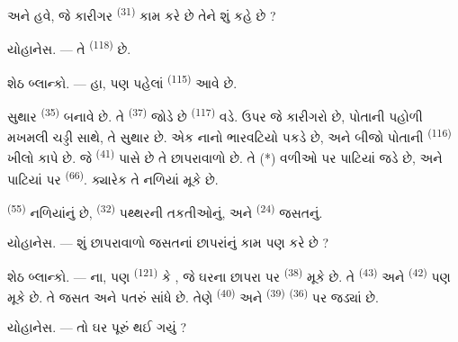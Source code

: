 અને હવે, જે કારીગર  \textsuperscript{(31)} કામ કરે છે
તેને શું કહે છે ?

\textsc{યોહાનેસ}. --- તે  \textsuperscript{(118)} છે.

\VUsaut{3.0mm}
\VUsaut{3.0mm}

\textsc{શેઠ બ્લાન્કો}. --- હા, પણ પહેલાં 
\textsuperscript{(115)} આવે છે.

સુથાર  \textsuperscript{(35)} બનાવે છે. તે
 \textsuperscript{(37)} જોડે છે 
\textsuperscript{(117)} વડે. ઉપર જે કારીગરો છે, પોતાની પહોળી મખમલી
ચડ્ડી સાથે, તે સુથાર છે. એક નાનો ભારવટિયો પકડે છે, અને બીજો પોતાની
 \textsuperscript{(116)} ખીલો કાપે છે. જે
 \textsuperscript{(41)} પાસે છે તે છાપરાવાળો છે. તે
(*) વળીઓ પર પાટિયાં જડે છે, અને પાટિયાં પર 
\textsuperscript{(66)}. ક્યારેક તે નળિયાં મૂકે છે.


 \textsuperscript{(55)} નળિયાંનું છે,
 \textsuperscript{(32)} પથ્થરની તકતીઓનું, અને
 \textsuperscript{(24)} જસતનું.

\textsc{યોહાનેસ}. --- શું છાપરાવાળો જસતનાં છાપરાંનું કામ પણ કરે છે ?

\textsc{શેઠ બ્લાન્કો}. --- ના, પણ 
\textsuperscript{(121)} કે , જે ઘરના છાપરા પર
 \textsuperscript{(38)} મૂકે છે. તે
 \textsuperscript{(43)} અને  \textsuperscript{(42)} પણ મૂકે છે. તે જસત અને પતરું સાંધે છે.
તેણે  \textsuperscript{(40)} અને 
\textsuperscript{(39)}  \textsuperscript{(36)} પર
જડ્યાં છે.

\textsc{યોહાનેસ}. --- તો ઘર પૂરું થઈ ગયું ?

\VUsaut{3.0mm}
\VUsaut{3.0mm}


